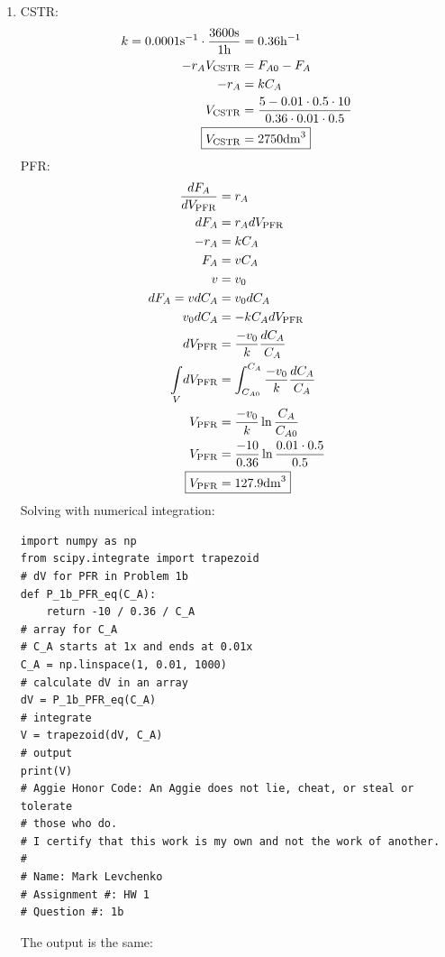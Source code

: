 \documentclass[12pt]{article}
\begin{document}
\begin{enumerate}
\begin{enumerate}
        \item
        CSTR:
        \begin{align*}
            k = 0.0001 \mathrm{s}^{-1} \cdot \frac{3600 \mathrm{s}}{1 \mathrm{h}} &= 0.36 \mathrm{h}^{-1} \\
            -r_A V_{\mathrm{CSTR}} &= F_{A0} - F_A \\
            -r_A &= k C_A\\
            V_{\mathrm{CSTR}} &= \frac{5 - 0.01 \cdot 0.5 \cdot 10}{0.36 \cdot 0.01 \cdot 0.5} \\
            \Aboxed{V_{\mathrm{CSTR}} &= 2750 \mathrm{dm}^3}
        \end{align*}
        PFR:
        \begin{align*}
            \frac{dF_A}{dV_{\mathrm{PFR}}} &= r_A \\
            dF_A &= r_A dV_{\mathrm{PFR}} \\ 
            -r_A &= k C_A \\
            F_A &= v C_A \\
            v &= v_0 \\
            dF_A = v dC_A &= v_0 dC_A \\
            v_0 dC_A &= -k C_A dV_{\mathrm{PFR}} \\
            dV_{\mathrm{PFR}} &= \frac{-v_0}{k} \frac{dC_A}{C_A} \\
            \underset{V}{\int} dV_{\mathrm{PFR}} &= \int^{C_A}_{C_{A0}} \frac{-v_0}{k} \frac{dC_A}{C_A} \\ 
            V_{\mathrm{PFR}} &= \frac{-v_0}{k} \ln{\frac{C_A}{C_{A0}}} \\
            V_{\mathrm{PFR}} &= \frac{-10}{0.36} \ln{\frac{0.01 \cdot 0.5}{0.5}} \\
            \Aboxed{V_{\mathrm{PFR}} &= 127.9 \mathrm{dm}^3}
        \end{align*}
        Solving with numerical integration:
\begin{verbatim}
import numpy as np
from scipy.integrate import trapezoid
# dV for PFR in Problem 1b
def P_1b_PFR_eq(C_A):
    return -10 / 0.36 / C_A
# array for C_A
# C_A starts at 1x and ends at 0.01x
C_A = np.linspace(1, 0.01, 1000)
# calculate dV in an array
dV = P_1b_PFR_eq(C_A)
# integrate
V = trapezoid(dV, C_A)
# output
print(V)
# Aggie Honor Code: An Aggie does not lie, cheat, or steal or tolerate
# those who do.
# I certify that this work is my own and not the work of another.
#
# Name: Mark Levchenko
# Assignment #: HW 1
# Question #: 1b
\end{verbatim}
        The output is the same:


\end{enumerate}
\end{enumerate}
\end{document}
